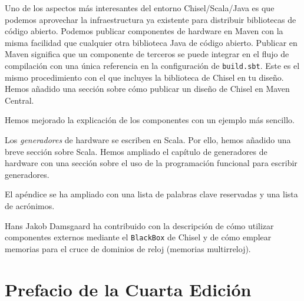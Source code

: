 \documentclass[%
    10pt,
    headinclude, footinclude=false,
    openright, %
    notitlepage,
    cleardoublepage=empty,
    headsepline,
    numbers=noenddot,
    bibliography=totoc, index=totoc,
    ]{scrbook}
\newcommand{\code}[1]{{\lstinline[basicstyle=\small\ttfamily]{#1}}}
\begin{document}
Uno de los aspectos más interesantes del entorno Chisel/Scala/Java es que podemos aprovechar la infraestructura ya 
existente para distribuir bibliotecas de código abierto. Podemos publicar componentes de hardware en Maven 
con la misma facilidad que cualquier otra biblioteca Java de código abierto. Publicar en Maven significa que un 
componente de terceros se puede integrar en el flujo de compilación con una única referencia en la configuración de 
\code{build.sbt}. Este es el mismo procedimiento con el que incluyes la biblioteca de Chisel en tu diseño. Hemos añadido 
una sección sobre cómo publicar un diseño de Chisel en Maven Central.


Hemos mejorado la explicación de los componentes con un ejemplo más sencillo.


Los \emph{generadores} de hardware se escriben en Scala. Por ello, hemos añadido una breve sección sobre Scala. 
Hemos ampliado el capítulo de generadores de hardware con una sección sobre el uso de la programación funcional 
para escribir generadores.


El apéndice se ha ampliado con una lista de palabras clave reservadas y una lista de acrónimos.


Hans Jakob Damsgaard ha contribuido con la descripción de cómo utilizar componentes externos mediante el 
\code{BlackBox} de Chisel y de cómo emplear memorias para el cruce de dominios de reloj (memorias multirreloj).

\section*{Prefacio de la Cuarta Edición}

\end{document}
